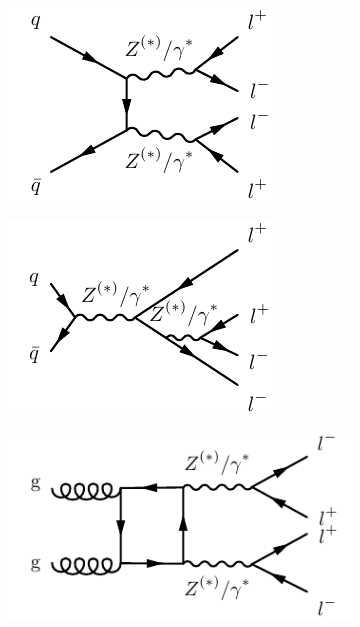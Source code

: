 \begin{figure}
\centering
\begin{subfigure}{.24\textwidth}
  \centering
  \includegraphics[width=.99\textwidth]{Figures/FeynGraphs/qqZZ4l.pdf}
  \caption{\qqZZ}
  \label{fig:m4lfeynman:qqZZ}
\end{subfigure}%
\begin{subfigure}{.24\textwidth}
  \centering
  \includegraphics[width=.99\textwidth]{Figures/FeynGraphs/qqZZ4lrad.pdf}
  \caption{\ZFourL{}}
  \label{fig:m4lfeynman:singleZ}
\end{subfigure}
\begin{subfigure}{.24\textwidth}
  \centering
  \includegraphics[width=.99\textwidth]{Figures/FeynGraphs/ggZZ4lbox.pdf}

\end{subfigure}
\end{figure}
